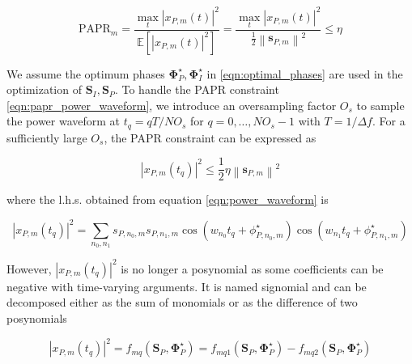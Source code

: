 \begin{equation}\label{eqn:papr_power_waveform}
  {\text{PAPR}_m} = \frac{{\mathop {\max }\limits_t {{\left| {{x_{P,m}}(t)} \right|}^2}}}{{\mathbb{E}\left[ {{{\left| {{x_{P,m}}(t)} \right|}^2}} \right]}} = \frac{{\mathop {\max }\limits_t {{\left| {{x_{P,m}}(t)} \right|}^2}}}{{\frac{1}{2}{{\left\| {{{\mathbf{s}}_{P,m}}} \right\|}^2}}} \leqslant \eta
\end{equation}

We assume the optimum phases ${\mathbf{\Phi }}_P^ \star ,{\mathbf{\Phi }}_I^ \star $ in \eqref{eqn:optimal_phases} are used in the optimization of ${{\mathbf{S}}_I},{{\mathbf{S}}_P}$. To handle the PAPR constraint \eqref{eqn:papr_power_waveform}, we introduce an oversampling factor ${O_s}$ to sample the power waveform at ${t_q} = qT/N{O_s}$ for $q = 0, \ldots ,N{O_s} - 1$ with $T = 1/\Delta f$. For a sufficiently large ${O_s}$, the PAPR constraint can be expressed as

\begin{equation}\label{eqn:papr_sample}
  {\left| {{x_{P,m}}\left( {{t_q}} \right)} \right|^2} \leqslant \frac{1}{2}\eta {\left\| {{{\mathbf{s}}_{P,m}}} \right\|^2}
\end{equation}

where the l.h.s. obtained from equation \ref{eqn:power_waveform} is

\begin{equation}\label{eqn:papr_average_sample}
  {\left| {{x_{P,m}}\left( {{t_q}} \right)} \right|^2} = \sum\limits_{{n_0},{n_1}} {{s_{P,{n_0},m}}{s_{P,{n_1},m}}\cos \left( {{w_{{n_0}}}{t_q} + \phi _{P,{n_0},m}^ \star } \right)\cos \left( {{w_{{n_1}}}{t_q} + \phi _{P,{n_1},m}^ \star } \right)}
\end{equation}

However, ${\left| {{x_{P,m}}\left( {{t_q}} \right)} \right|^2}$ is no longer a posynomial as some coefficients can be negative with time-varying arguments. It is named signomial \cite{Boyd2007} and can be decomposed either as the sum of monomials or as the difference of two posynomials

\begin{equation}\label{eqn:papr_signomial}
  {\left| {{x_{P,m}}\left( {{t_q}} \right)} \right|^2} = {f_{mq}}\left( {{{\mathbf{S}}_P},{\mathbf{\Phi }}_P^ \star } \right) = {f_{mq1}}\left( {{{\mathbf{S}}_P},{\mathbf{\Phi }}_P^ \star } \right) - {f_{mq2}}\left( {{{\mathbf{S}}_P},{\mathbf{\Phi }}_P^ \star } \right)
\end{equation}

